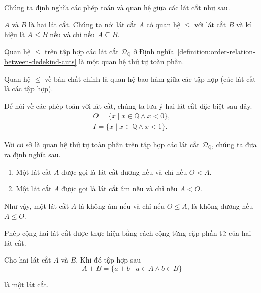 Chúng ta định nghĩa các phép toán và quan hệ giữa các lát cắt như sau.

\begin{definition}\label{definition:order-relation-between-dedekind-cuts}
	$A$ và $B$ là hai lát cắt. Chúng ta nói lát cắt $A$ có quan hệ $\leq$ với lát cắt $B$ và kí hiệu là $A\leq B$ nếu và chỉ nếu $A\subseteq B$.
\end{definition}

\begin{theorem}
	Quan hệ $\leq$ trên tập hợp các lát cắt $\mathscr{D}_{\mathbb{Q}}$ ở Định nghĩa~\ref{definition:order-relation-between-dedekind-cuts} là một quan hệ thứ tự toàn phần.
\end{theorem}

Quan hệ $\leq$ về bản chất chính là quan hệ bao hàm giữa các tập hợp (các lát cắt là các tập hợp).

Để nói về các phép toán với lát cắt, chúng ta lưu ý hai lát cắt đặc biệt sau đây.
\[
	\begin{split}
		O = \{ x \mid x\in\mathbb{Q} \wedge x < 0 \}, \\
		I = \{ x \mid x\in\mathbb{Q} \wedge x < 1 \}.
	\end{split}
\]

Với cơ sở là quan hệ thứ tự toàn phần trên tập hợp các lát cắt $\mathscr{D}_{\mathbb{Q}}$, chúng ta đưa ra định nghĩa sau.
\begin{definition}
	\begin{enumerate}[label={(\roman*)}]
		\item Một lát cắt $A$ được gọi là lát cắt dương nếu và chỉ nếu $O < A$.
		\item Một lát cắt $A$ được gọi là lát cắt âm nếu và chỉ nếu $A < O$.
	\end{enumerate}
\end{definition}

Như vậy, một lát cắt $A$ là không âm nếu và chỉ nếu $O\leq A$, là không dương nếu $A\leq O$.

Phép cộng hai lát cắt được thực hiện bằng cách cộng từng cặp phần tử của hai lát cắt.
\begin{theorem}
	Cho hai lát cắt $A$ và $B$. Khi đó tập hợp sau
	\[
		A + B = \{ a + b \mid a\in A\wedge b\in B \}
	\]

	là một lát cắt.
\end{theorem}


